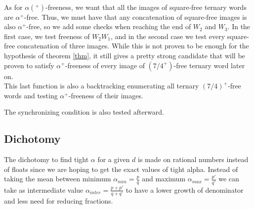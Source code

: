 \documentclass[a4paper]{article}
\theoremstyle{definition}
\begin{document}
\paragraph{}

As for $\alpha(^+)$-freeness, we want that all the images of square-free ternary words are $\alpha^+$-free. Thus, we must have that any concatenation of square-free images is also $\alpha^+$-free, so we add some checks when reaching the end of $W_2$ and $W_3$. In the first case, we test freeness of $W_2W_1$, and in the second case we test every square-free concatenation of three images. While this is not proven to be enough for the hypothesis of theorem \ref{thm}, it still gives a pretty strong candidate that will be proven to satisfy $\alpha^+$-freeness of every image of $(7/4^+)$-free ternary word later on.\\
This last function is also a backtracking enumerating all ternary $(7/4)^+$-free words and testing $\alpha^+$-freeness of their images.

The synchronizing condition is also tested afterward.

\subsection{Dichotomy}

The dichotomy to find tight $\alpha$ for a given $d$ is made on rational numbers instead of floats since we are hoping to get the exact values of tight alpha. Instead of taking the mean between minimum $\alpha_{min} = \frac{p}{q}$ and maximum $\alpha_{max} = \frac{p'}{q'}$ we can take as intermediate value $\alpha_{inter} = \frac{p+p'}{q+q'}$ to have a lower growth of denominator and less need for reducing fractions.



\end{document}
